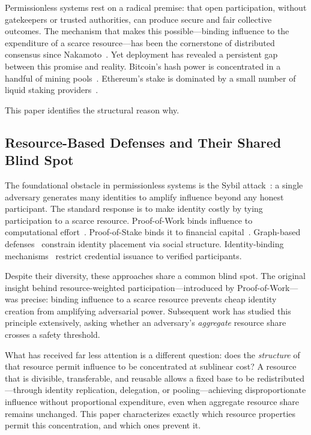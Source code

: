 \documentclass[10pt,journal,compsoc]{IEEEtran}
\theoremstyle{remark}
\begin{document}
	Permissionless systems rest on a radical premise: that open
	participation, without gatekeepers or trusted authorities,
	can produce secure and fair collective outcomes.
	The mechanism that makes this possible---binding influence
	to the expenditure of a scarce resource---has been the
	cornerstone of distributed consensus since
	Nakamoto~\cite{nakamoto2008bitcoin}.
	Yet deployment has revealed a persistent gap between
	this promise and reality.
	Bitcoin's hash power is concentrated in a handful of
	mining pools~\cite{gencer2018decentralization}.
	Ethereum's stake is dominated by a small number of
	liquid staking providers~\cite{lido2023concentration}.
	
	This paper identifies the structural reason why.
	
	\subsection{Resource-Based Defenses and Their Shared Blind Spot}
	\label{ssec:sybil}
	
	The foundational obstacle in permissionless systems is the
	Sybil attack~\cite{douceur2002sybil}: a single adversary
	generates many identities to amplify influence beyond any
	honest participant.
	The standard response is to make identity costly by tying
	participation to a scarce resource.
	Proof-of-Work binds influence to computational
	effort~\cite{nakamoto2008bitcoin,garay2015backbone}.
	Proof-of-Stake binds it to financial
	capital~\cite{kiayias2017ouroboros}.
	Graph-based defenses~\cite{yu2006sybilguard,yu2008sybillimit}
	constrain identity placement via social structure.
	Identity-binding mechanisms~\cite{borge2017pop,ford2020pseudonym}
	restrict credential issuance to verified participants.
	
	Despite their diversity, these approaches share a common
	blind spot.
	The original insight behind resource-weighted
	participation---introduced by Proof-of-Work---was
	precise: binding influence to a scarce resource
	prevents cheap identity creation from amplifying
	adversarial power.
	Subsequent work has studied this principle extensively,
	asking whether an adversary's \emph{aggregate} resource
	share crosses a safety threshold.
	
	What has received far less attention is a different
	question: does the \emph{structure} of that resource
	permit influence to be concentrated at sublinear cost?
	A resource that is divisible, transferable, and reusable
	allows a fixed base to be redistributed---through
	identity replication, delegation, or pooling---achieving
	disproportionate influence without proportional expenditure,
	even when aggregate resource share remains unchanged.
	This paper characterizes exactly which resource properties
	permit this concentration, and which ones prevent it.
	
\end{document}
